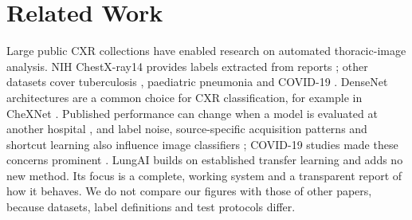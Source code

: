 \section{Related Work}\label{sec:related}
Large public CXR collections have enabled research on automated thoracic-image analysis. NIH
ChestX-ray14 provides labels extracted from reports \cite{wang2017chestxray8}; other datasets cover
tuberculosis \cite{jaeger2014two,liu2020rethinking}, paediatric pneumonia \cite{kermany2018identifying}
and COVID-19 \cite{cohen2020covid,chowdhury2020can}. DenseNet architectures \cite{huang2017densely} are a
common choice for CXR classification, for example in CheXNet \cite{rajpurkar2017chexnet}. Published
performance can change when a model is evaluated at another hospital \cite{zech2018variable}, and label
noise, source-specific acquisition patterns and shortcut learning also influence image classifiers
\cite{oakdenrayner2020exploring,degrave2021ai,geirhos2020shortcut}; COVID-19 studies made these concerns
prominent \cite{roberts2021common,maguolo2020critic}. LungAI builds on established transfer learning and
adds no new method. Its focus is a complete, working system and a transparent report of how it behaves.
We do not compare our figures with those of other papers, because datasets, label definitions and test
protocols differ.
